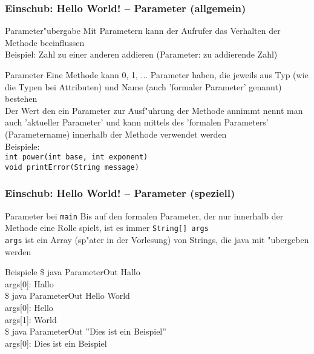 \documentclass{beamer}
\begin{document}
\begin{frame}
\frametitle{Einschub: Hello World! -- Parameter (allgemein)}
\begin{block}{Parameter"ubergabe}
Mit Parametern kann der Aufrufer das Verhalten der Methode beeinflussen\\
Beispiel: Zahl zu einer anderen addieren (Parameter: zu addierende Zahl)
\end{block}

\pause

\begin{block}{Parameter}
Eine Methode kann 0, 1, ... Parameter haben, die jeweils aus Typ (wie die Typen bei Attributen) und Name (auch 'formaler Parameter' genannt) bestehen\\
Der Wert den ein Parameter zur Ausf"uhrung der Methode annimmt nennt man auch 'aktueller Parameter' und kann mittels des 'formalen Parameters' (Parametername) innerhalb der Methode verwendet werden\\
Beispiele:\\
\lstinline|int power(int base, int exponent)|\\
\lstinline|void printError(String message)|
\end{block}
\end{frame}

\begin{frame}
\frametitle{Einschub: Hello World! -- Parameter (speziell)}
\begin{block}{Parameter bei \texttt{main}}
Bis auf den formalen Parameter, der nur innerhalb der Methode eine Rolle spielt, ist es immer \texttt{String[] args}\\
\texttt{args} ist ein Array (sp"ater in der Vorlesung) von Strings, die java mit "ubergeben werden
\end{block}

\pause

\begin{block}{Beispiele}
\ttfamily
\$ java ParameterOut Hallo\\
args[0]: Hallo\\[0.5em]
\$ java ParameterOut Hello World\\
args[0]: Hello\\
args[1]: World\\[0.5em]
\$ java ParameterOut \textrm{''}Dies ist ein Beispiel\textrm{''}\\
args[0]: Dies ist ein Beispiel
\end{block}
\end{frame}
\end{document}
